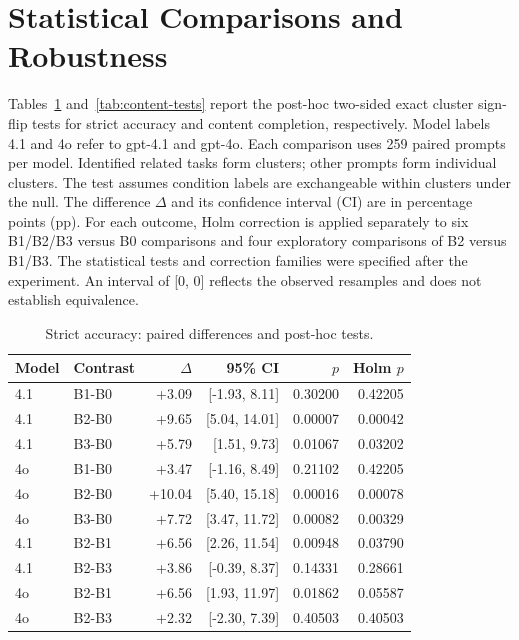 \section{Statistical Comparisons and Robustness}
\label{app:statistics}
Tables~\ref{tab:strict-tests} and~\ref{tab:content-tests} report the post-hoc two-sided exact cluster sign-flip tests for strict accuracy and content completion, respectively. Model labels 4.1 and 4o refer to gpt-4.1 and gpt-4o. Each comparison uses 259 paired prompts per model. Identified related tasks form clusters; other prompts form individual clusters. The test assumes condition labels are exchangeable within clusters under the null. The difference $\Delta$ and its confidence interval (CI) are in percentage points (pp). For each outcome, Holm correction is applied separately to six B1/B2/B3 versus B0 comparisons and four exploratory comparisons of B2 versus B1/B3. The statistical tests and correction families were specified after the experiment. An interval of [0, 0] reflects the observed resamples and does not establish equivalence.


\begin{table}[!t]
\caption{Strict accuracy: paired differences and post-hoc tests.}
\label{tab:strict-tests}
\centering\scriptsize
\begin{tabular}{llrrrr}
\toprule
Model & Contrast & $\Delta$ & 95\% CI & $p$ & Holm $p$ \\
\midrule

4.1 & B1-B0 & +3.09 & [-1.93, 8.11] & 0.30200 & 0.42205 \\

4.1 & B2-B0 & +9.65 & [5.04, 14.01] & 0.00007 & 0.00042 \\

4.1 & B3-B0 & +5.79 & [1.51, 9.73] & 0.01067 & 0.03202 \\

4o & B1-B0 & +3.47 & [-1.16, 8.49] & 0.21102 & 0.42205 \\

4o & B2-B0 & +10.04 & [5.40, 15.18] & 0.00016 & 0.00078 \\

4o & B3-B0 & +7.72 & [3.47, 11.72] & 0.00082 & 0.00329 \\

4.1 & B2-B1 & +6.56 & [2.26, 11.54] & 0.00948 & 0.03790 \\

4.1 & B2-B3 & +3.86 & [-0.39, 8.37] & 0.14331 & 0.28661 \\

4o & B2-B1 & +6.56 & [1.93, 11.97] & 0.01862 & 0.05587 \\

4o & B2-B3 & +2.32 & [-2.30, 7.39] & 0.40503 & 0.40503 \\

\bottomrule
\end{tabular}
\end{table}


